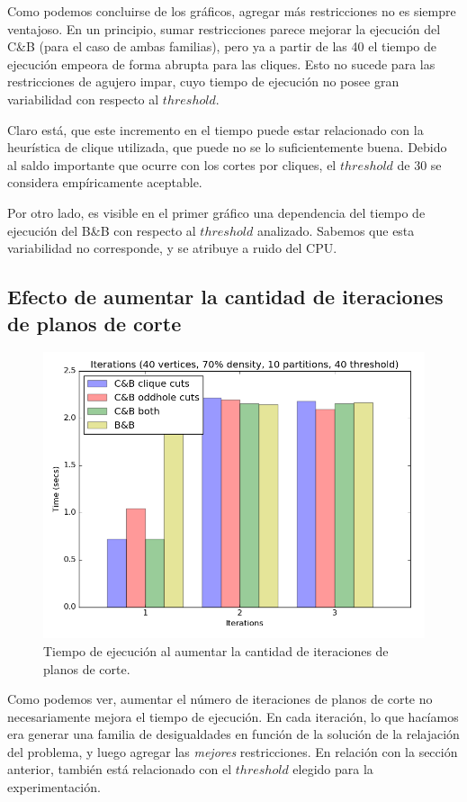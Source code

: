 Como podemos concluirse de los gráficos, agregar más restricciones no es siempre ventajoso. En un principio, sumar restricciones parece mejorar la ejecución del C\&B (para el caso de ambas familias), pero ya a partir de las 40 el tiempo de ejecución empeora de forma abrupta para las cliques. Esto no sucede para las restricciones de agujero impar, cuyo tiempo de ejecución no posee gran variabilidad con respecto al $threshold$.

Claro está, que este incremento en el tiempo puede estar relacionado con la heurística de clique utilizada, que puede no se lo suficientemente buena. Debido al saldo importante que ocurre con los cortes por cliques, el $threshold$ de 30 se considera empíricamente aceptable.

Por otro lado, es visible en el primer gráfico una dependencia del tiempo de ejecución del B\&B con respecto al $threshold$ analizado. Sabemos que esta variabilidad no corresponde, y se atribuye a ruido del CPU.

\subsection{Efecto de aumentar la cantidad de iteraciones de planos de corte}

\begin{figure}[h]
\centering
\includegraphics[scale=0.5]{img/7-iterations_v40_p10_l40_t1_b0.png}
\caption{Tiempo de ejecución al aumentar la cantidad de iteraciones de planos de corte.}
\end{figure}

Como podemos ver, aumentar el número de iteraciones de planos de corte no necesariamente mejora el tiempo de ejecución. En cada iteración, lo que hacíamos era generar una familia de desigualdades en función de la solución de la relajación del problema, y luego agregar las \textit{mejores} restricciones. En relación con la sección anterior, también está relacionado con el $threshold$ elegido para la experimentación.


